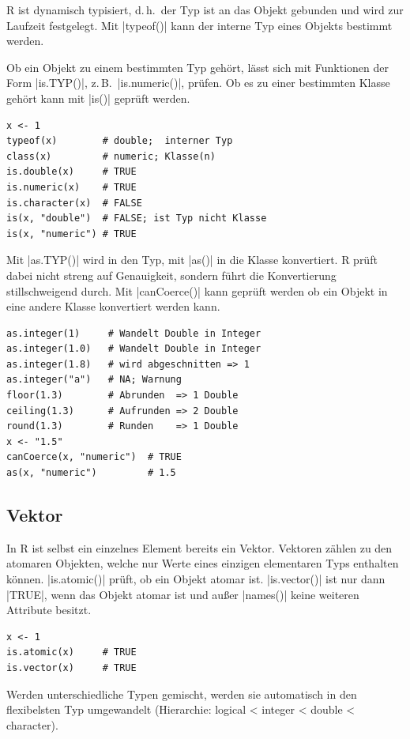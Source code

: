 \documentclass[10pt,twocolumn]{scrartcl}
\renewcommand{\lstinline}{\mycoloredinline}
\begin{document}
R ist dynamisch typisiert, d.\,h.\ der Typ ist an das Objekt gebunden und wird zur Laufzeit festgelegt. Mit \lstinline|typeof()| kann der interne Typ eines Objekts bestimmt werden.

Ob ein Objekt zu einem bestimmten Typ gehört, lässt sich mit Funktionen der Form
\lstinline|is.TYP()|, z.\,B.\ \lstinline|is.numeric()|, prüfen. Ob es zu einer bestimmten Klasse gehört kann mit \lstinline|is()| geprüft werden.

\begin{lstlisting}
x <- 1
typeof(x)        # double;  interner Typ
class(x)         # numeric; Klasse(n)
is.double(x)     # TRUE
is.numeric(x)    # TRUE
is.character(x)  # FALSE
is(x, "double")  # FALSE; ist Typ nicht Klasse
is(x, "numeric") # TRUE
\end{lstlisting}

Mit \lstinline|as.TYP()| wird in den Typ, mit \lstinline|as()| in die Klasse konvertiert. R prüft dabei nicht streng auf Genauigkeit, sondern führt die Konvertierung stillschweigend durch. Mit \lstinline|canCoerce()| kann geprüft werden ob ein Objekt in eine andere Klasse konvertiert werden kann.

\begin{lstlisting}
as.integer(1)     # Wandelt Double in Integer
as.integer(1.0)   # Wandelt Double in Integer
as.integer(1.8)   # wird abgeschnitten => 1
as.integer("a")   # NA; Warnung
floor(1.3)        # Abrunden  => 1 Double
ceiling(1.3)      # Aufrunden => 2 Double
round(1.3)        # Runden    => 1 Double
x <- "1.5"
canCoerce(x, "numeric")  # TRUE
as(x, "numeric")         # 1.5
\end{lstlisting}


\subsection{Vektor}

In R ist selbst ein einzelnes Element bereits ein Vektor. Vektoren zählen zu den atomaren Objekten, welche nur Werte eines einzigen elementaren Typs enthalten können. \lstinline|is.atomic()| prüft, ob ein Objekt atomar ist. \lstinline|is.vector()| ist nur dann \lstinline|TRUE|, wenn das Objekt atomar ist und außer \lstinline|names()| keine weiteren Attribute besitzt.

\begin{lstlisting}
x <- 1
is.atomic(x)     # TRUE
is.vector(x)     # TRUE
\end{lstlisting}

Werden unterschiedliche Typen gemischt, werden sie automatisch in den flexibelsten Typ umgewandelt (Hierarchie: logical < integer < double < character).
\end{document}
